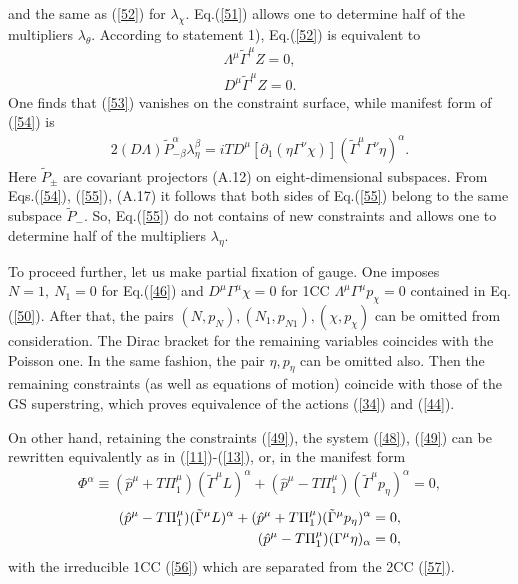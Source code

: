 \documentclass[a4paper]{article}
\begin{document}
and the same as (\ref{52}) for $\lambda_\chi$. Eq.(\ref{51}) allows 
one to determine half of the multipliers $\lambda_\theta$. According 
to statement 1), Eq.(\ref{52}) is equivalent to 
\begin{eqnarray}\label{53}
\Lambda^\mu\tilde\Gamma^\mu Z=0,
\end{eqnarray}
\begin{eqnarray}\label{54}
D^\mu\tilde\Gamma^\mu Z=0.
\end{eqnarray}
One finds that (\ref{53}) vanishes on the constraint surface, while 
manifest form of (\ref{54}) is 
\begin{eqnarray}\label{55}
2(D\Lambda)\tilde P^\alpha_{-\beta}\lambda^\beta_\eta=iTD^\mu
[\partial_1(\eta\Gamma^\nu\chi)](\tilde\Gamma^\mu\Gamma^\nu\eta)^\alpha.
\end{eqnarray}
Here $\tilde P_{\pm}$ are covariant projectors (A.12) on eight-dimensional 
subspaces. From Eqs.(\ref{54}), (\ref{55}), (A.17) it follows that 
both sides of Eq.(\ref{55}) belong to the same subspace $\tilde P_-$. 
So, Eq.(\ref{55}) do not contains of new constraints and allows one to 
determine half of the multipliers $\lambda_\eta$.

To proceed further, let us make partial fixation of gauge. One imposes 
$N=1, ~ N_1=0$ for Eq.(\ref{46}) and $D^\mu\Gamma^\mu\chi=0$ for 
1CC $\Lambda^\mu\Gamma^\mu p_\chi=0$ contained in Eq.(\ref{50}). After 
that, the pairs $(N, p_N), (N_1, p_{N1}), (\chi, p_\chi)$ can be omitted 
from consideration. The Dirac bracket for the remaining variables 
coincides with the Poisson one. In the same fashion, the pair 
$\eta, p_\eta$ can be omitted also. Then the remaining constraints (as 
well as equations of motion) coincide with those of the GS superstring, 
which proves equivalence of the actions (\ref{34}) and (\ref{44}).

On other hand, retaining the constraints (\ref{49}), the system 
(\ref{48}), (\ref{49}) can be rewritten equivalently as in 
(\ref{11})-(\ref{13}), or, in the manifest form 
\begin{eqnarray}\label{56}
\Phi^\alpha\equiv(\hat p^\mu+T\Pi_1^\mu)(\tilde\Gamma^\mu L)^\alpha+
(\hat p^\mu-T\Pi_1^\mu)(\tilde\Gamma^\mu p_\eta)^\alpha=0, 
\end{eqnarray}
\begin{eqnarray}\label{57}
(\hat p^\mu-T\Pi_1^\mu)(\tilde\Gamma^\mu L)^\alpha+
(\hat p^\mu+T\Pi_1^\mu)(\tilde\Gamma^\mu p_\eta)^\alpha=0, \cr
(\hat p^\mu-T\Pi_1^\mu)(\Gamma^\mu\eta)_\alpha=0,
\end{eqnarray}
with the irreducible 1CC (\ref{56}) which are separated from the
2CC (\ref{57}).
\end{document}
